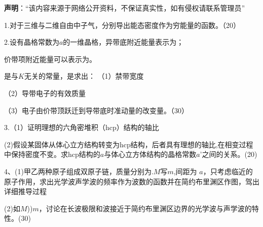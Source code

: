 
\textbf{声明}：“该内容来源于网络公开资料，不保证真实性，如有侵权请联系管理员”

1.对于三维与二维自由中子气，分别导出能态密度作为穷能量的函数。（20）

2.设有晶格常数为$a$的一维晶格，异带底附近能量表示为；

价带项附近能量可以表示为。

是与$K$无关的常量，是求出：
（1）禁带宽度

（2）导带电子的有效质量

（3）电子由价带顶跃迁到导带底时准动量的改变量。（30）

3.（1）证明理想的六角密堆积（hcp）结构的轴比

(2)假设某固体从体心立方结构转变为hcp结构，后者具有理想的轴比,在相变过程中保持密度不变。求hcp结构的$a$与体心立方体结构的晶格常数$a$’之间的关系。(20)

4、(1)甲乙两种原子组成双原子链，质量分别为.$M$写$m$,间距为 $a$，只考虑临近的原子作用，求出光学波声学波的频率作为波数的函数并在简约布里渊区作图，驾出详细推导过程

(2)如$M$))$m$，讨论在长波极限和波接近于简约布里渊区边界的光学波与声学波的特性。(30)










